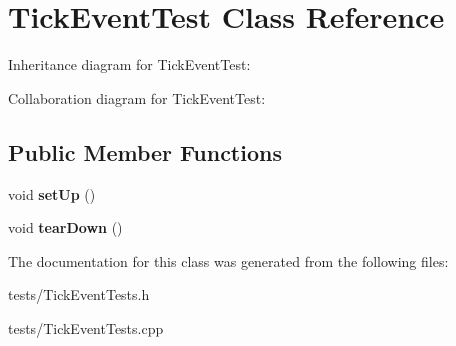 \hypertarget{classTickEventTest}{}\section{Tick\+Event\+Test Class Reference}
\label{classTickEventTest}


Inheritance diagram for Tick\+Event\+Test\+:


Collaboration diagram for Tick\+Event\+Test\+:
\subsection*{Public Member Functions}
\begin{DoxyCompactItemize}
\item 
void {\bfseries set\+Up} ()\hypertarget{classTickEventTest_a9b85f20eeee1d3dbc75893636bf70f5d}{}\label{classTickEventTest_a9b85f20eeee1d3dbc75893636bf70f5d}

\item 
void {\bfseries tear\+Down} ()\hypertarget{classTickEventTest_a804c01402993dfe04031443df494f921}{}\label{classTickEventTest_a804c01402993dfe04031443df494f921}

\end{DoxyCompactItemize}


The documentation for this class was generated from the following files\+:\begin{DoxyCompactItemize}
\item 
tests/Tick\+Event\+Tests.\+h\item 
tests/Tick\+Event\+Tests.\+cpp\end{DoxyCompactItemize}
